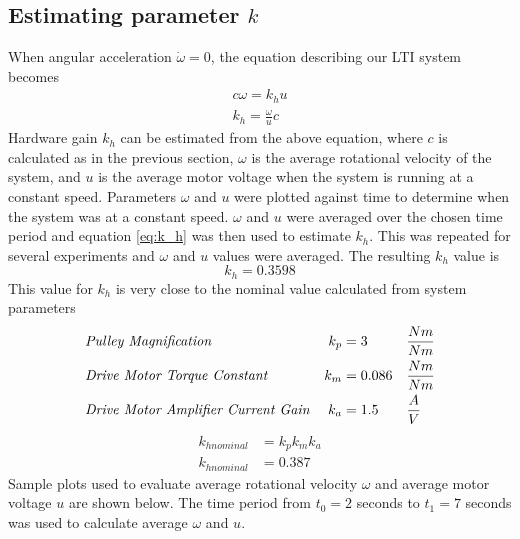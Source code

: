 \documentclass[11pt,titlepage]{article}
\begin{document}
    \subsection{Estimating parameter $k$}
        When angular acceleration $\dot{\omega}=0$, the equation describing our LTI system becomes
        \begin{align}
            c\omega=k_hu\nonumber\\
            k_h=\frac{\omega}{u}c\label{eq:k_h}
        \end{align}
        Hardware gain $k_h$ can be estimated from the above equation, where $c$ is calculated as in the previous section, $\omega$ is the average rotational velocity of the system, and $u$ is the average motor voltage when the system is running at a constant speed. Parameters $\omega$ and $u$ were plotted against time to determine when the system was at a constant speed. $\omega$ and $u$ were averaged over the chosen time period and equation \ref{eq:k_h} was then used to estimate $k_h$. This was repeated for several experiments and $\omega$ and $u$ values were averaged. The resulting $k_h$ value is
        \begin{equation}
            k_h=0.3598\nonumber
        \end{equation}
        This value for $k_h$ is very close to the nominal value calculated from system parameters 
        \begin{align*}
            &\mbox{\emph{Pulley Magnification}}                 &       k_p&=3      &   &\frac{Nm}{Nm}\\
            &\mbox{\emph{Drive Motor Torque Constant}}          &       k_m&=0.086  &   &\frac{Nm}{Nm}\\
            &\mbox{\emph{Drive Motor Amplifier Current Gain}}   &       k_a&=1.5    &   &\frac{A}{V}
        \end{align*}
        \begin{align*}
            k_{h nominal}&=k_pk_mk_a\\
            k_{h nominal}&=0.387
        \end{align*}
        Sample plots used to evaluate average rotational velocity $\omega$ and average motor voltage $u$ are shown below. The time period from $t_0=2$ seconds to $t_1=7$ seconds was used to calculate average $\omega$ and $u$.
\end{document}
